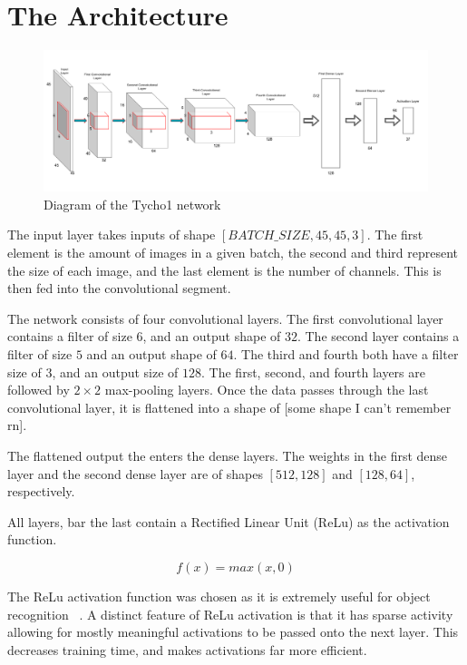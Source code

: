 \documentclass[12pt,a4paper,oneside,oldfontcommands]{memoir}
\begin{document}
\section{The Architecture}

\begin{figure}[H]
  \centering
    \includegraphics[width=\linewidth]{images/Tycho1.png}
    \caption{Diagram of the Tycho1 network}
    \label{fig:tycho1}
\end{figure}


The input layer takes inputs of shape \([BATCH\_SIZE, 45, 45, 3]\). The first element is the amount of images in a given batch, the second and third represent the size of each image, and the last element is the number of channels. This is then fed into the convolutional segment.

The network consists of four convolutional layers. The first convolutional layer contains a filter of size \(6\), and an output shape of \(32\). The second layer contains a filter of size \(5\) and an output shape of \(64\). The third and fourth both have a filter size of \(3\), and an output size of \(128\). The first, second, and fourth layers are followed by \(2\times2\) max-pooling layers. Once the data passes through the last convolutional layer, it is flattened into a shape of [some shape I can’t remember rn].

The flattened output the enters the dense layers. The weights in the first dense layer and the second dense layer are of shapes \([512, 128]\) and \([128, 64]\), respectively. 

All layers, bar the last contain a Rectified Linear Unit (ReLu) as the activation function.

\begin{equation}
    f(x)=max(x, 0)
    \label{eq:relu}
\end{equation}



The ReLu activation function was chosen as it is extremely useful for object recognition ~\cite{ReLu}. A distinct feature of ReLu activation is that it has sparse activity allowing for mostly meaningful activations to be passed onto the next layer. This decreases training time, and makes activations far more efficient.
\end{document}
